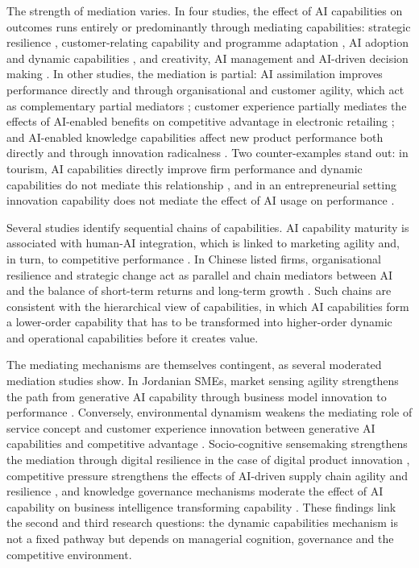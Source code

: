 The strength of mediation varies. In four studies, the effect of AI capabilities on outcomes runs entirely or predominantly through mediating capabilities: strategic resilience \parencite[1]{wang2026}, customer-relating capability and programme adaptation \parencite[1]{slrR120}, AI adoption and dynamic capabilities \parencite[1]{slrR011}, and creativity, AI management and AI-driven decision making \parencite[1]{chen2022}. In other studies, the mediation is partial: AI assimilation improves performance directly and through organisational and customer agility, which act as complementary partial mediators \parencite[1]{fossowamba2022}; customer experience partially mediates the effects of AI-enabled benefits on competitive advantage in electronic retailing \parencite[1]{bunea2026}; and AI-enabled knowledge capabilities affect new product performance both directly and through innovation radicalness \parencite[84]{dinh2026}. Two counter-examples stand out: in tourism, AI capabilities directly improve firm performance and dynamic capabilities do not mediate this relationship \parencite[1]{slrR050}, and in an entrepreneurial setting innovation capability does not mediate the effect of AI usage on performance \parencite[1]{slrR025}.

Several studies identify sequential chains of capabilities. AI capability maturity is associated with human-AI integration, which is linked to marketing agility and, in turn, to competitive performance \parencite[1]{slrR149}. In Chinese listed firms, organisational resilience and strategic change act as parallel and chain mediators between AI and the balance of short-term returns and long-term growth \parencite[1]{liang2026}. Such chains are consistent with the hierarchical view of capabilities, in which AI capabilities form a lower-order capability that has to be transformed into higher-order dynamic and operational capabilities before it creates value.

The mediating mechanisms are themselves contingent, as several moderated mediation studies show. In Jordanian SMEs, market sensing agility strengthens the path from generative AI capability through business model innovation to performance \parencite[1]{slrR091}. Conversely, environmental dynamism weakens the mediating role of service concept and customer experience innovation between generative AI capabilities and competitive advantage \parencite[10]{li2025}. Socio-cognitive sensemaking strengthens the mediation through digital resilience in the case of digital product innovation \parencite[1]{slrR132}, competitive pressure strengthens the effects of AI-driven supply chain agility and resilience \parencites[1]{slrR041}[1]{slrR108}, and knowledge governance mechanisms moderate the effect of AI capability on business intelligence transforming capability \parencite[1]{slrR131}. These findings link the second and third research questions: the dynamic capabilities mechanism is not a fixed pathway but depends on managerial cognition, governance and the competitive environment.

